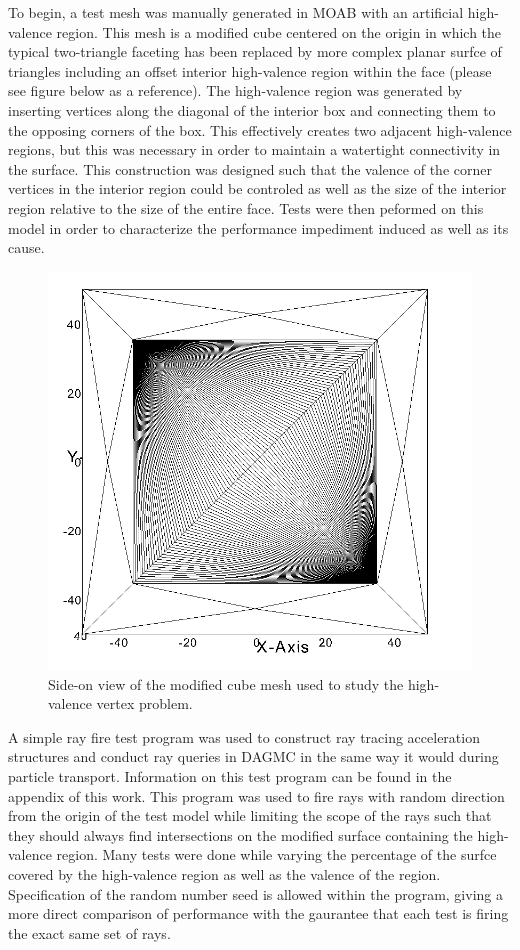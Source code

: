 \documentclass[10pt, a4paper]{article}
\begin{document}
To begin, a test mesh was manually generated in MOAB with an artificial high-valence region. This mesh is a modified cube centered on the origin in which the typical two-triangle faceting has been replaced by more complex planar surfce of triangles including an offset interior high-valence region within the face (please see figure below as a reference). The high-valence region was generated by inserting vertices along the diagonal of the interior box and connecting them to the opposing corners of the box. This effectively creates two adjacent high-valence regions, but this was necessary in order to maintain a watertight connectivity in the surface. This construction was designed such that the valence of the corner vertices in the interior region could be controled as well as the size of the interior region relative to the size of the entire face. Tests were then peformed on this model in order to characterize the performance impediment induced as well as its cause.

\begin{figure}[H]
  \centering
    \includegraphics[scale=0.2]{hv_study_design.png}
    \caption{Side-on view of the modified cube mesh used to study the high-valence vertex problem.}
\end{figure}

A simple ray fire test program was used to construct ray tracing acceleration structures and conduct ray queries in DAGMC in the same way it would during particle transport. Information on this test program can be found in the appendix of this work. This program was used to fire rays with random direction from the origin of the test model while limiting the scope of the rays such that they should always find intersections on the modified surface containing the high-valence region. Many tests were done while varying the percentage of the surfce covered by the high-valence region as well as the valence of the region. Specification of the random number seed is allowed within the program, giving a more direct comparison of performance with the gaurantee that each test is firing the exact same set of rays.
\end{document}
